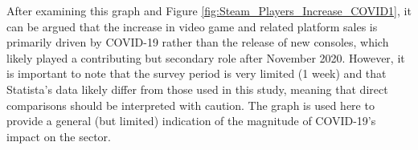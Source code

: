 After examining this graph and Figure \ref{fig:Steam_Players_Increase_COVID1}, it can be argued that the increase 
in video game and related platform sales is primarily driven by
COVID-19 rather than the release of new consoles, which likely 
played a contributing but secondary role after November 2020. However, it is 
important to note that the survey period is very limited 
(1 week) and that Statista's data likely differ from those used
in this study, meaning that direct comparisons should be 
interpreted with caution. The graph is used here to provide a 
general (but limited) indication of the magnitude of COVID-19’s 
impact on the sector.
